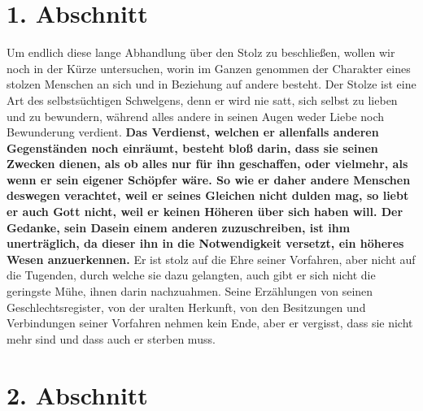 \newpage

\section{1. Abschnitt} \label{kap12_ab1}

 Um endlich diese lange Abhandlung über den Stolz
zu beschließen, wollen wir noch
in der Kürze untersuchen, worin im Ganzen genommen der Charakter eines stolzen
Menschen an sich und in Beziehung auf andere besteht. Der Stolze ist eine Art des
selbstsüchtigen Schwelgens, denn er wird nie satt, sich selbst zu lieben und zu
bewundern, während alles andere in seinen Augen weder Liebe noch Bewunderung
verdient.    \label{ref:12_01_egoisten}
\textbf{Das Verdienst, welchen er allenfalls anderen
Gegenständen noch
einräumt, besteht bloß darin, dass sie seinen Zwecken dienen, als ob alles nur
für ihn geschaffen, oder vielmehr, als wenn er sein eigener Schöpfer wäre. So
wie er daher andere Menschen deswegen verachtet, weil er seines Gleichen nicht
dulden mag, so liebt er auch Gott nicht, weil er keinen Höheren über sich haben
will. Der Gedanke, sein Dasein einem anderen zuzuschreiben, ist ihm unerträglich,
da dieser ihn in die Notwendigkeit versetzt, ein höheres Wesen anzuerkennen.}
Er
ist stolz auf die Ehre seiner Vorfahren, aber nicht auf die Tugenden, durch
welche sie dazu gelangten, auch gibt er sich nicht die geringste Mühe, ihnen
darin nachzuahmen. Seine Erzählungen von seinen Geschlechtsregister, von der
uralten Herkunft, von den Besitzungen und Verbindungen seiner Vorfahren nehmen
kein Ende, aber er vergisst, dass sie nicht mehr sind und dass auch er sterben
muss.

\section{2. Abschnitt} \label{kap12_ab2}

